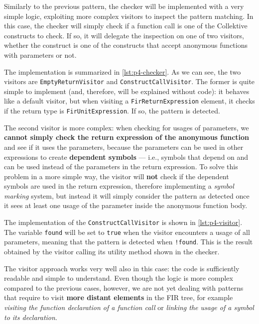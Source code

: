 \documentclass[12pt,a4paper,openright,twoside]{book}
\begin{document}
Similarly to the previous pattern, the checker will be implemented with a very
simple logic, exploiting more complex visitors to inspect the pattern matching.
In this case, the checker will simply check if a function call is one of the 
Collektive constructs to check. If so, it will delegate the inspection on one
of two visitors, whether the construct is one of the constructs that accept
anonymous functions with parameters or not.

The implementation is summarized in \cref{lst:p4-checker}. As we can see, the
two visitors are \lstinline{EmptyReturnVisitor} and
\lstinline{ConstructCallVisitor}. The former is quite simple to implement (and,
therefore, will be explained without code): it behaves like a default
visitor, but when visiting a \lstinline{FirReturnExpression} element, it checks
if the return type is \lstinline{FirUnitExpression}. If so, the pattern is
detected.



The second visitor is more complex: when checking for usages of parameters, we
\textbf{cannot simply check the return expression of the anonymous function} and
see if it uses the parameters, because the parameters can be used in other
expressions to create \textbf{dependent symbols} --- i.e., symbols that depend
on and can be used instead of the parameters in the return expression.
%
To solve this problem in a more simple way, the visitor will \textbf{not} check
if the dependent symbols are used in the return expression, therefore
implementing a \emph{symbol marking} system, but instead it will simply consider
the pattern as detected once it sees at least one usage of the parameter inside
the anonymous function body.  

The implementation of the \lstinline{ConstructCallVisitor} is shown in
\cref{lst:p4-visitor}. The variable \lstinline{found} will be set to
\lstinline{true} when the visitor encounters a usage of all parameters, meaning
that the pattern is detected when \lstinline{!found}. This is the result
obtained by the visitor calling its utility method shown in the checker. 



The visitor approach works very well also in this case: the code is sufficiently
readable and simple to understand. Even though the logic is more complex
compared to the previous cases, however, we are not yet dealing with patterns
that require to visit \textbf{more distant elements} in the \ac{FIR} tree, for
example \emph{visiting the function declaration of a function call} or
\emph{linking the usage of a symbol to its declaration}. 
\end{document}
